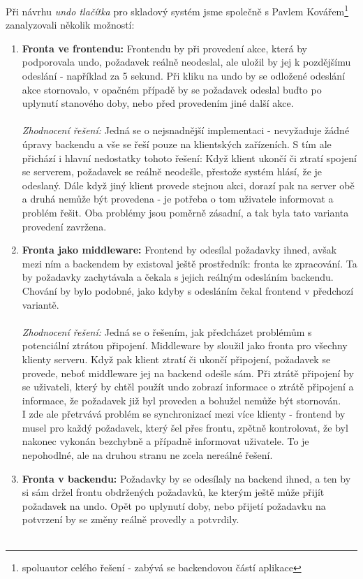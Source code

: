 Při návrhu \emph{undo tlačítka} pro skladový systém jsme společně s Pavlem Kovářem\footnote{spoluautor celého řešení - zabývá se backendovou částí aplikace} zanalyzovali několik možností:
\begin{enumerate}
	\item \textbf{Fronta ve frontendu:} Frontendu by při provedení akce, která by podporovala undo, požadavek reálně neodeslal, ale uložil by jej k pozdějšímu odeslání - například za 5 sekund. Při kliku na undo by se odložené odeslání akce stornovalo, v opačném případě by se požadavek odeslal buďto po uplynutí stanového doby, nebo před provedením jiné další akce.\\\\
	\emph{Zhodnocení řešení:} Jedná se o nejsnadnější implementaci - nevyžaduje žádné úpravy backendu a vše se řeší pouze na klientských zařízeních. S tím ale přichází i hlavní nedostatky tohoto řešení: Když klient ukončí či ztratí spojení se serverem, požadavek se reálně neodešle, přestože systém hlásí, že je odeslaný. Dále když jiný klient provede stejnou akci, dorazí pak na server obě a druhá nemůže být provedena - je potřeba o tom uživatele informovat a problém řešit. Oba problémy jsou poměrně zásadní, a tak byla tato varianta provedení zavržena.
	\item \textbf{Fronta jako middleware:} Frontend by odesílal požadavky ihned, avšak mezi ním a backendem by existoval ještě prostředník: fronta ke zpracování. Ta by požadavky zachytávala a čekala s jejich reálným odesláním backendu. Chování by bylo podobné, jako kdyby s odesláním čekal frontend v předchozí variantě.\\\\
	\emph{Zhodnocení řešení:} Jedná se o řešením, jak předcházet problémům s potenciální ztrátou připojení. Middleware by sloužil jako fronta pro všechny klienty serveru. Když pak klient ztratí či ukončí připojení, požadavek se provede, neboť middleware jej na backend odešle sám. Při ztrátě připojení by se uživateli, který by chtěl použít undo zobrazí informace o ztrátě připojení a informace, že požadavek již byl proveden a bohužel nemůže být stornován.\\
	I zde ale přetrvává problém se synchronizací mezi více klienty - frontend by musel pro každý požadavek, který šel přes frontu, zpětně kontrolovat, že byl nakonec vykonán bezchybně a případně informovat uživatele. To je nepohodlné, ale na druhou stranu ne zcela nereálné řešení.
	\item \textbf{Fronta v backendu:} Požadavky by se odesílaly na backend ihned, a ten by si sám držel frontu obdržených požadavků, ke kterým ještě může přijít požadavek na undo. Opět po uplynutí doby, nebo přijetí požadavku na potvrzení by se změny reálně provedly a potvrdily.\\\\

\end{enumerate}
